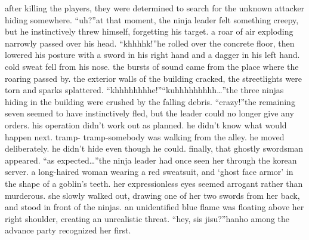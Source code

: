 after killing the players, they were determined to search for the unknown attacker hiding somewhere.
“uh?”at that moment, the ninja leader felt something creepy, but he instinctively threw himself, forgetting his target.
a roar of air exploding narrowly passed over his head.
“khhhhk!”he rolled over the concrete floor, then lowered his posture with a sword in his right hand and a dagger in his left hand.
 cold sweat fell from his nose.
the bursts of sound came from the place where the roaring passed by.
 the exterior walls of the building cracked, the streetlights were torn and sparks splattered.
“khhhhhhhhe!”“kuhhhhhhhhh…”the three ninjas hiding in the building were crushed by the falling debris.
“crazy!”the remaining seven seemed to have instinctively fled, but the leader could no longer give any orders.
 his operation didn’t work out as planned.
he didn’t know what would happen next.
tramp- tramp-somebody was walking from the alley.
 he moved deliberately.
 he didn’t hide even though he could.
finally, that ghostly swordsman appeared.
“as expected…”the ninja leader had once seen her through the korean server.
a long-haired woman wearing a red sweatsuit, and ‘ghost face armor’ in the shape of a goblin’s teeth.
 her expressionless eyes seemed arrogant rather than murderous.
she slowly walked out, drawing one of her two swords from her back, and stood in front of the ninjas.
 an unidentified blue flame was floating above her right shoulder, creating an unrealistic threat.
“hey, sis jisu?”hanho among the advance party recognized her first.


 